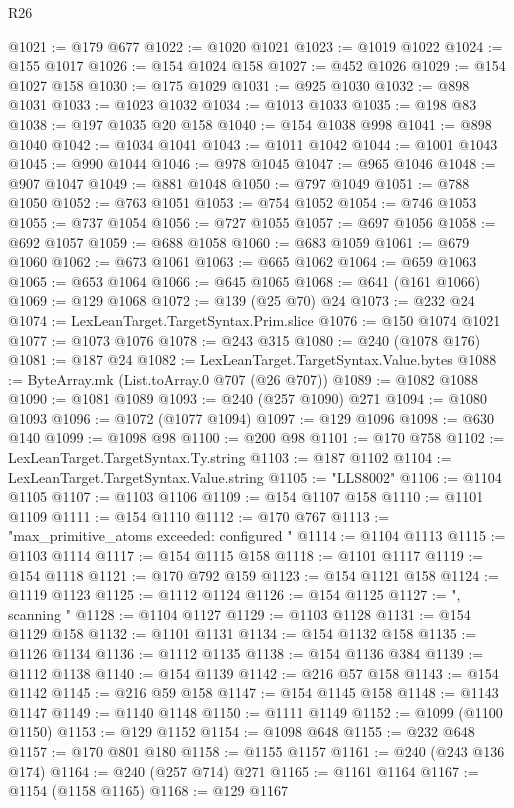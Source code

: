 \begin{lexlean}{R26}
\begin{coremodule}
@1021 := @179 @677
@1022 := @1020 @1021
@1023 := @1019 @1022
@1024 := @155 @1017
@1026 := @154 @1024 @158
@1027 := @452 @1026
@1029 := @154 @1027 @158
@1030 := @175 @1029
@1031 := @925 @1030
@1032 := @898 @1031
@1033 := @1023 @1032
@1034 := @1013 @1033
@1035 := @198 @83
@1038 := @197 @1035 @20 @158
@1040 := @154 @1038 @998
@1041 := @898 @1040
@1042 := @1034 @1041
@1043 := @1011 @1042
@1044 := @1001 @1043
@1045 := @990 @1044
@1046 := @978 @1045
@1047 := @965 @1046
@1048 := @907 @1047
@1049 := @881 @1048
@1050 := @797 @1049
@1051 := @788 @1050
@1052 := @763 @1051
@1053 := @754 @1052
@1054 := @746 @1053
@1055 := @737 @1054
@1056 := @727 @1055
@1057 := @697 @1056
@1058 := @692 @1057
@1059 := @688 @1058
@1060 := @683 @1059
@1061 := @679 @1060
@1062 := @673 @1061
@1063 := @665 @1062
@1064 := @659 @1063
@1065 := @653 @1064
@1066 := @645 @1065
@1068 := @641 (@161 @1066)
@1069 := @129 @1068
@1072 := @139 (@25 @70) @24
@1073 := @232 @24
@1074 := LexLeanTarget.TargetSyntax.Prim.slice
@1076 := @150 @1074 @1021
@1077 := @1073 @1076
@1078 := @243 @315
@1080 := @240 (@1078 @176)
@1081 := @187 @24
@1082 := LexLeanTarget.TargetSyntax.Value.bytes
@1088 := ByteArray.mk (List.toArray.{0} @707 (@26 @707))
@1089 := @1082 @1088
@1090 := @1081 @1089
@1093 := @240 (@257 @1090) @271
@1094 := @1080 @1093
@1096 := @1072 (@1077 @1094)
@1097 := @129 @1096
@1098 := @630 @140
@1099 := @1098 @98
@1100 := @200 @98
@1101 := @170 @758
@1102 := LexLeanTarget.TargetSyntax.Ty.string
@1103 := @187 @1102
@1104 := LexLeanTarget.TargetSyntax.Value.string
@1105 := "LLS8002"
@1106 := @1104 @1105
@1107 := @1103 @1106
@1109 := @154 @1107 @158
@1110 := @1101 @1109
@1111 := @154 @1110
@1112 := @170 @767
@1113 := "max_primitive_atoms exceeded: configured "
@1114 := @1104 @1113
@1115 := @1103 @1114
@1117 := @154 @1115 @158
@1118 := @1101 @1117
@1119 := @154 @1118
@1121 := @170 @792 @159
@1123 := @154 @1121 @158
@1124 := @1119 @1123
@1125 := @1112 @1124
@1126 := @154 @1125
@1127 := ", scanning "
@1128 := @1104 @1127
@1129 := @1103 @1128
@1131 := @154 @1129 @158
@1132 := @1101 @1131
@1134 := @154 @1132 @158
@1135 := @1126 @1134
@1136 := @1112 @1135
@1138 := @154 @1136 @384
@1139 := @1112 @1138
@1140 := @154 @1139
@1142 := @216 @57 @158
@1143 := @154 @1142
@1145 := @216 @59 @158
@1147 := @154 @1145 @158
@1148 := @1143 @1147
@1149 := @1140 @1148
@1150 := @1111 @1149
@1152 := @1099 (@1100 @1150)
@1153 := @129 @1152
@1154 := @1098 @648
@1155 := @232 @648
@1157 := @170 @801 @180
@1158 := @1155 @1157
@1161 := @240 (@243 @136 @174)
@1164 := @240 (@257 @714) @271
@1165 := @1161 @1164
@1167 := @1154 (@1158 @1165)
@1168 := @129 @1167

\end{coremodule}
\end{lexlean}

